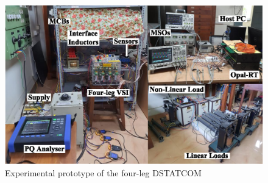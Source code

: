 \begin{figure}[h!]  
	\centering
	\includegraphics[scale=1]{figures/Chapter_4/Mine/Hardware_Picture_modified.eps}
	\caption{Experimental prototype of the four-leg DSTATCOM}  
	\label{fig4.11}
\end{figure}	

